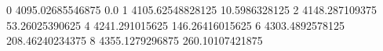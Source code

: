 0 4095.02685546875 0.0
1 4105.62548828125 10.5986328125
2 4148.287109375 53.26025390625
4 4241.291015625 146.26416015625
6 4303.4892578125 208.46240234375
8 4355.1279296875 260.10107421875
